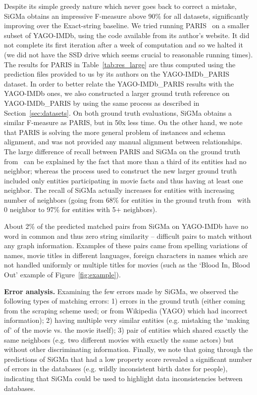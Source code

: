 \documentclass{sig-alternate}
\newcommand{\ts}[1]{\textsf{#1}}
\begin{document}
Despite its simple greedy nature which never goes back to correct a mistake, \ts{SiGMa} obtains an impressive F-measure above 90\% for all datasets, significantly improving over the \ts{Exact-string} baseline. We tried running \ts{PARIS}~\cite{suchanek12PARIS} on a smaller subset of \ts{YAGO}-\ts{IMDb}, using the code available from its author's website. It did not complete its first iteration after a week of computation and so we halted it (we did not have the SSD drive which seems crucial to reasonable running times). The results for \ts{PARIS} in Table~\ref{tab:res_large} are thus computed using the prediction files provided to us by its authors on the \ts{YAGO}-\ts{IMDb\_PARIS} dataset. In order to better relate the \ts{YAGO}-\ts{IMDb\_PARIS} results with the \ts{YAGO}-\ts{IMDb} ones, we also constructed a larger ground truth reference on \ts{YAGO}-\ts{IMDb\_PARIS} by using the same process as described in Section~\ref{sec:datasets}. On both ground truth evaluations, \ts{SiGMa} obtains a similar F-measure as \ts{PARIS}, but in 50x less time. On the other hand, we note that \ts{PARIS} is solving the more general problem of instances and schema alignment, and was not provided any manual alignment between relationships. The large difference of recall between \ts{PARIS} and \ts{SiGMa} on the ground truth from~\cite{suchanek12PARIS} can be explained by the fact that more than a third of its entities had no neighbor; whereas the process used to construct the new larger ground truth included only entities participating in movie facts and thus having at least one neighbor. The recall of \ts{SiGMa} actually increases for entities with increasing number of neighbors (going from 68\% for entities in the ground truth from~\cite{suchanek12PARIS} with 0 neighbor to 97\% for entities with 5+ neighbors).

About 2\% of the predicted matched pairs from \ts{SiGMa} on \ts{YAGO}-\ts{IMDb} have no word in common and thus zero string similarity -- difficult pairs to match without any graph information. Examples of these pairs came from spelling variations of names, movie titles in different languages, foreign characters in names which are not handled uniformly or multiple titles for movies (such as the `Blood In, Blood Out' example of Figure~\ref{fig:example}).

\textbf{Error analysis.} Examining the few errors made by \ts{SiGMa}, we observed the following types of matching errors: 1) errors in the ground truth (either coming from the scraping scheme used; or from Wikipedia (\ts{YAGO}) which had incorrect information); 2) having multiple very similar entities (e.g. mistaking the `making of' of the movie vs. the movie itself); 3) pair of entities which shared exactly the same neighbors (e.g. two different movies with exactly the same actors) but without other discriminating information. Finally, we note that going through the predictions of \ts{SiGMa} that had a low property score revealed a significant number of errors in the databases (e.g. wildly inconsistent birth dates for people), indicating that \ts{SiGMa} could be used to highlight data inconsistencies between databases.
%
%
\end{document}
